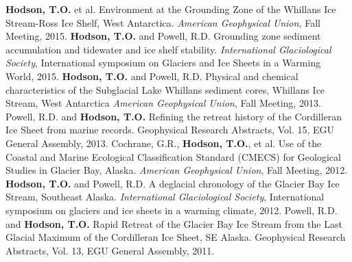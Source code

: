 \renewcommand{\refname}{Conference Participation}
\begin{thebibliography}{3}
\bibitem{}\textbf{Hodson, T.O.} et al. Environment at the Grounding Zone of the Whillans Ice Stream-Ross Ice Shelf, West Antarctica.
\textsl{American Geophysical Union}, Fall Meeting, 2015.
\bibitem{}\textbf{Hodson, T.O.} and Powell, R.D. Grounding zone sediment accumulation and tidewater and ice shelf stability. 
\textsl{International Glaciological Society}, International symposium on Glaciers and Ice Sheets in a Warming World, 2015.
\bibitem{}\textbf{Hodson, T.O.} and Powell, R.D. Physical and chemical characteristics of the Subglacial Lake Whillans sediment cores, Whillans Ice Stream, West Antarctica
\textsl{American Geophysical Union}, Fall Meeting, 2013.
\bibitem{}Powell, R.D. and \textbf{Hodson, T.O.} Refining the retreat history of the Cordilleran Ice Sheet from marine records. Geophysical Research Abstracts, Vol. 15, EGU General Assembly, 2013.
\bibitem{}Cochrane, G.R., \textbf{Hodson, T.O.}, et al. Use of the Coastal and Marine Ecological Classification Standard (CMECS) for Geological Studies in Glacier Bay, Alaska.
\textsl{American Geophysical Union}, Fall Meeting, 2012.
\bibitem{}\textbf{Hodson, T.O.} and Powell, R.D. A deglacial chronology of the Glacier Bay Ice Stream, Southeast Alaska.
\textsl{International Glaciological Society}, International symposium on glaciers and ice sheets in a warming climate, 2012.
\bibitem{}Powell, R.D. and \textbf{Hodson, T.O.} Rapid Retreat of the Glacier Bay Ice Stream from the Last Glacial Maximum of the Cordilleran Ice Sheet, SE Alaska. Geophysical Research Abstracts, Vol. 13, EGU General Assembly, 2011.
\end{thebibliography}
